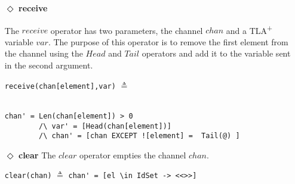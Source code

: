 \documentclass{thesul}
\newcommand{\tlaplus}{TLA\textsuperscript{+}\xspace}
\begin{document}
\begin{itemize}
The $multicast$ operator handles two parameters, the channel $chan$ and a \tlaplus expression. The second parameter specifies the intended recipients in the channel and the message. The purpose of this operator is to identify the recipients such that if they fall within the required subset, the message is added to their sets; otherwise, their sets remain unchanged.

\begin{minipage}{.44\textwidth}

\lstinline|multicast(chan, [a \in sub -> msg])| $\triangleq$\\\\\\
\end{minipage}\hfill
\begin{minipage}{.6\textwidth}
\begin{lstlisting}[frame = none, numbers = none]
chan'=[el \in DOMAIN chan 
			|-> IF el \in sub 
       THEN Append(chan[el], msg)
       ELSE chan[el]
\end{lstlisting}

\end{minipage}\hfill


\item[$\Diamond$]  \textbf{receive}

The $receive$ operator has two parameters, the channel $chan$ and a \tlaplus variable $var$. The purpose of this operator is to remove the first element from the channel using the $Head$ and $Tail$ operators and add it to the variable sent in the second argument.

\begin{minipage}{.3\textwidth}

\lstinline|receive(chan[element],var)| $\triangleq$\\\\
\end{minipage}\hfill
\begin{minipage}{.7\textwidth}
\begin{lstlisting}[frame = none, numbers = none]
chan' = Len(chan[element]) > 0 
        /\ var' = [Head(chan[element])]
        /\ chan' = [chan EXCEPT ![element] =  Tail(@) ]
\end{lstlisting}

\end{minipage}\hfill

\item[$\Diamond$]  \textbf{clear}
The $clear$ operator empties the channel $chan$.

\begin{center}

\lstinline|clear(chan)| $\triangleq$
\lstinline|chan' = [el \in IdSet -> <<>>]|

\end{center}
\end{itemize}
\end{document}
